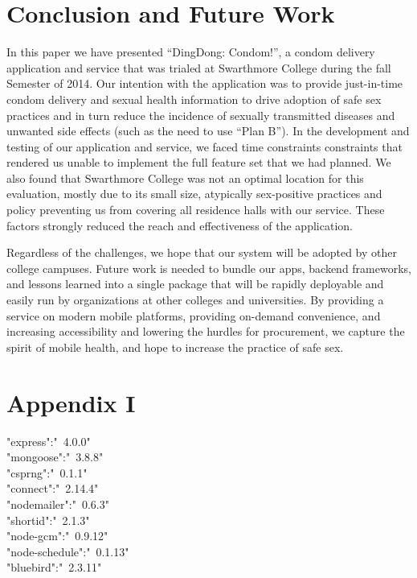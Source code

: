 \documentclass{acm_proc_article-sp}
\begin{document}
\section{Conclusion and Future Work}
\smallskip
In this paper we have presented “DingDong: Condom!”, a condom delivery application and service that was trialed at Swarthmore College during the fall Semester of 2014. Our intention with the application was to provide just-in-time condom delivery and sexual health information to drive adoption of safe sex practices and in turn reduce the incidence of sexually transmitted diseases and unwanted side effects (such as the need to use ``Plan B''). In the development and testing of our application and service, we faced time constraints constraints that rendered us unable to implement the full feature set that we had planned. We also found that Swarthmore College was not an optimal location for this evaluation, mostly due to its small size, atypically sex-positive practices and policy preventing us from covering all residence halls with our service. These factors strongly reduced the reach and effectiveness of the application.

Regardless of the challenges, we hope that our system will be adopted by other college campuses. Future work is needed to bundle our apps, backend frameworks, and lessons learned into a single package that will be rapidly deployable and easily run by organizations at other colleges and universities. By providing a service on modern mobile platforms, providing on-demand convenience, and increasing accessibility and lowering the hurdles for procurement, we capture the spirit of mobile health, and hope to increase the practice of safe sex.

\section{Appendix I}
\smallskip
"express":"~4.0.0"\\
"mongoose":"~3.8.8"\\
"csprng":"~0.1.1"\\
"connect":"~2.14.4"\\
"nodemailer":"~0.6.3"\\
"shortid":"~2.1.3"\\
"node-gcm":"~0.9.12"\\
"node-schedule":"~0.1.13"\\
"bluebird":"~2.3.11"



\end{document}
